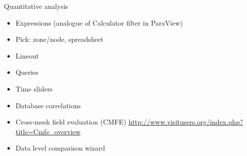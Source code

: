 \begin{frame}{Quantitative analysis}{}
  \begin{itemize}
  \item Expressions (analogue of Calculator filter in ParaView)
  \item Pick: zone/node, spreadsheet
  \item Lineout
  \item Queries
  \item Time sliders
  \item Database correlations
  \item Cross-mesh field evaluation (CMFE)
    \url{http://www.visitusers.org/index.php?title=Cmfe_overview}
  \item Data level comparison wizard
  \end{itemize}
\end{frame}
